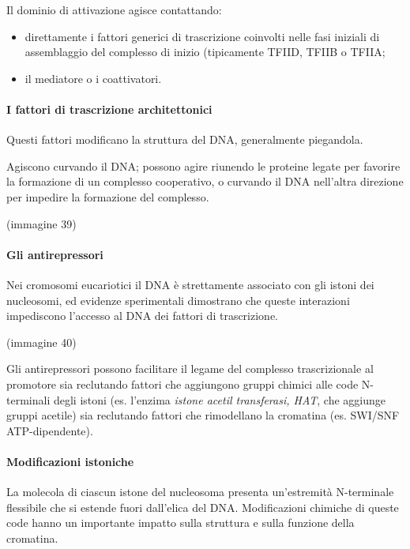 \documentclass[]{article}
\begin{document}
Il dominio di attivazione agisce contattando:

\begin{itemize}
\itemsep1pt\parskip0pt
\item
  direttamente i fattori generici di trascrizione coinvolti nelle fasi
  iniziali di assemblaggio del complesso di inizio (tipicamente TFIID,
  TFIIB o TFIIA;
\item
  il mediatore o i coattivatori.
\end{itemize}

\paragraph{I fattori di trascrizione
architettonici}\label{i-fattori-di-trascrizione-architettonici}

Questi fattori modificano la struttura del DNA, generalmente piegandola.

Agiscono curvando il DNA; possono agire riunendo le proteine legate per
favorire la formazione di un complesso cooperativo, o curvando il DNA
nell'altra direzione per impedire la formazione del complesso.

(immagine 39)

\paragraph{Gli antirepressori}\label{gli-antirepressori}

Nei cromosomi eucariotici il DNA è strettamente associato con gli istoni
dei nucleosomi, ed evidenze sperimentali dimostrano che queste
interazioni impediscono l'accesso al DNA dei fattori di trascrizione.

(immagine 40)

Gli antirepressori possono facilitare il legame del complesso
trascrizionale al promotore sia reclutando fattori che aggiungono gruppi
chimici alle code N-terminali degli istoni (es. l'enzima \emph{istone
acetil transferasi, HAT}, che aggiunge gruppi acetile) sia reclutando
fattori che rimodellano la cromatina (es. SWI/SNF ATP-dipendente).

\paragraph{Modificazioni istoniche}\label{modificazioni-istoniche}

La molecola di ciascun istone del nucleosoma presenta un'estremità
N-terminale flessibile che si estende fuori dall'elica del DNA.
Modificazioni chimiche di queste code hanno un importante impatto sulla
struttura e sulla funzione della cromatina.
\end{document}
